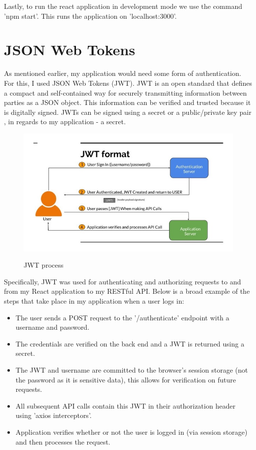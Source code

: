 Lastly, to run the react application in development mode we use the command 'npm start'. This runs the application on 'localhost:3000'.

\section{JSON Web Tokens}
As mentioned earlier, my application would need some form of authentication. For this, I used JSON Web Tokens (JWT). JWT is an open standard that defines a compact and self-contained way for securely transmitting information between parties as a JSON object. This information can be verified and trusted because it is digitally signed. JWTs can be signed using a secret or a public/private key pair \cite{JWT}, in regards to my application - a secret.

\begin{figure}[ht]
    \centering
    \includegraphics[scale=0.4]{Images/jwt1.jpeg} 
    \label{jwt1_label}
    \caption{JWT process}
\end{figure}

Specifically, JWT was used for authenticating and authorizing requests to and from my React application to my RESTful API. Below is a broad example of the steps that take place in my application when a user logs in:
\begin{itemize}
    \item The user sends a POST request to the '/authenticate' endpoint with a username and password. 
    \item The credentials are verified on the back end and a JWT is returned using a secret.
    \item The JWT and username are committed to the browser's session storage (not the password as it is sensitive data), this allows for verification on future requests.
    \item All subsequent API calls contain this JWT in their  authorization header using 'axios interceptors'.
    \item Application verifies whether or not the user is logged in (via session storage) and then processes the request.
\end{itemize}


